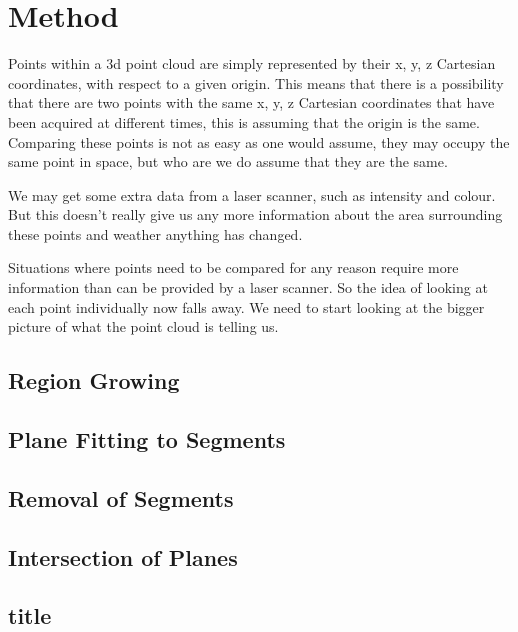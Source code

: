 \section{Method}


	
	
	
	Points within a 3d point cloud are simply represented by their x, y, z Cartesian coordinates, with respect to a given origin. This means that there is a possibility that there are two points with the same x, y, z Cartesian coordinates that have been acquired at different times, this is assuming that the origin is the same. Comparing these points is not as easy as one would assume, they may occupy the same point in space, but who are we do assume that they are the same.
	
	We may get some extra data from a laser scanner, such as intensity and colour. But this doesn't really give us any more information about the area surrounding these points and weather anything has changed.
	
	Situations where points need to be compared for any reason require more information than can be provided by a laser scanner. So the idea of looking at each point individually now falls away. We need to start looking at the bigger picture of what the point cloud is telling us.
	

	

	
	
	\subsection{Region Growing}
	
	\subsection{Plane Fitting to Segments}
	
	\subsection{Removal of Segments}
	
	\subsection{Intersection of Planes}
	
	\subsection{title}